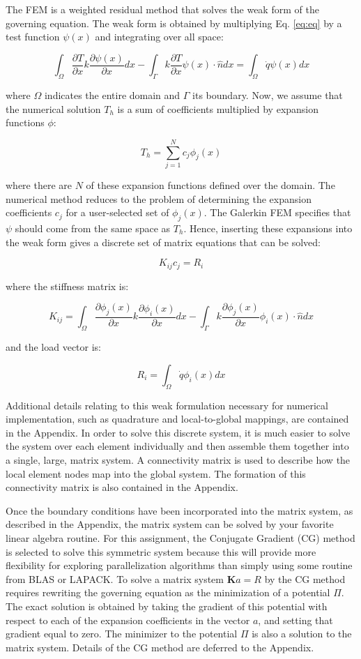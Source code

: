 \documentclass[10pt]{article}
\newcommand{\beq}{\begin{equation}}
\newcommand{\eeq}{\end{equation}}
\begin{document}
The FEM is a weighted residual method that solves the weak form of the governing equation. The weak form is obtained by multiplying Eq. \eqref{eq:eq} by a test function \(\psi(x)\) and integrating over all space:

\beq
\int_{\Omega}\frac{\partial T}{\partial x}k\frac{\partial\psi(x)}{\partial x}dx-\int_{\Gamma}k\frac{\partial T}{\partial x}\psi(x)\cdot\hat{n}dx=\int_{\Omega}\dot{q}\psi(x)dx
\eeq

where \(\Omega\) indicates the entire domain and \(\Gamma\) its boundary. Now, we assume that the numerical solution \(T_h\) is a sum of coefficients multiplied by expansion functions \(\phi\):

\beq
T_h=\sum_{j=1}^{N}c_j\phi_j(x)
\eeq

where there are \(N\) of these expansion functions defined over the domain. The numerical method reduces to the problem of determining the expansion coefficients \(c_j\) for a user-selected set of \(\phi_j(x)\). The Galerkin FEM specifies that \(\psi\) should come from the same space as \(T_h\). Hence, inserting these expansions into the weak form gives a discrete set of matrix equations that can be solved:

\beq
K_{ij}c_j=R_i
\eeq

where the stiffness matrix is:

\beq
\label{eq:k}
K_{ij}=\int_{\Omega}\frac{\partial \phi_j(x)}{\partial x}k\frac{\partial\phi_i(x)}{\partial x}dx-\int_{\Gamma}k\frac{\partial \phi_j(x)}{\partial x}\phi_i(x)\cdot\hat{n}dx
\eeq

and the load vector is:

\beq
R_{i}=\int_{\Omega}\dot{q}\phi_i(x)dx
\eeq

Additional details relating to this weak formulation necessary for numerical implementation, such as quadrature and local-to-global mappings, are contained in the Appendix. In order to solve this discrete system, it is much easier to solve the system over each element individually and then assemble them together into a single, large, matrix system. A connectivity matrix is used to describe how the local element nodes map into the global system. The formation of this connectivity matrix is also contained in the Appendix. 

Once the boundary conditions have been incorporated into the matrix system, as described in the Appendix, the matrix system can be solved by your favorite linear algebra routine. For this assignment, the Conjugate Gradient (CG) method is selected to solve this symmetric system because this will provide more flexibility for exploring parallelization algorithms than simply using some routine from BLAS or LAPACK. To solve a matrix system \(\textbf{K}a=R\) by the CG method requires rewriting the governing equation as the minimization of a potential \(\Pi\). The exact solution is obtained by taking the gradient of this potential with respect to each of the expansion coefficients in the vector \(a\), and setting that gradient equal to zero. The minimizer to the potential \(\Pi\) is also a solution to the matrix system. Details of the CG method are deferred to the Appendix.
\end{document}
